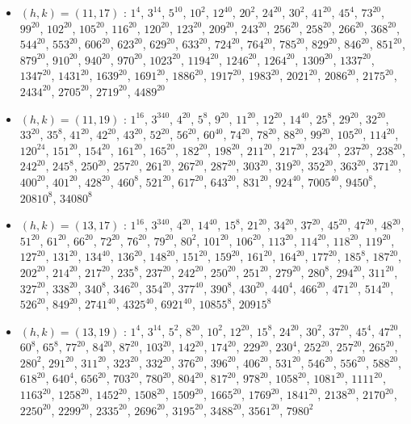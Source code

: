 \begin{itemize}
\item $(h,k)=(11,17)$ : $1^{4}$, $3^{14}$, $5^{10}$, $10^{2}$, $12^{40}$, $20^{2}$, $24^{20}$, $30^{2}$, $41^{20}$, $45^{4}$, $73^{20}$, $99^{20}$, $102^{20}$, $105^{20}$, $116^{20}$, $120^{20}$, $123^{20}$, $209^{20}$, $243^{20}$, $256^{20}$, $258^{20}$, $266^{20}$, $368^{20}$, $544^{20}$, $553^{20}$, $606^{20}$, $623^{20}$, $629^{20}$, $633^{20}$, $724^{20}$, $764^{20}$, $785^{20}$, $829^{20}$, $846^{20}$, $851^{20}$, $879^{20}$, $910^{20}$, $940^{20}$, $970^{20}$, $1023^{20}$, $1194^{20}$, $1246^{20}$, $1264^{20}$, $1309^{20}$, $1337^{20}$, $1347^{20}$, $1431^{20}$, $1639^{20}$, $1691^{20}$, $1886^{20}$, $1917^{20}$, $1983^{20}$, $2021^{20}$, $2086^{20}$, $2175^{20}$, $2434^{20}$, $2705^{20}$, $2719^{20}$, $4489^{20}$
\item $(h,k)=(11,19)$ : $1^{16}$, $3^{340}$, $4^{20}$, $5^{8}$, $9^{20}$, $11^{20}$, $12^{20}$, $14^{40}$, $25^{8}$, $29^{20}$, $32^{20}$, $33^{20}$, $35^{8}$, $41^{20}$, $42^{20}$, $43^{20}$, $52^{20}$, $56^{20}$, $60^{40}$, $74^{20}$, $78^{20}$, $88^{20}$, $99^{20}$, $105^{20}$, $114^{20}$, $120^{24}$, $151^{20}$, $154^{20}$, $161^{20}$, $165^{20}$, $182^{20}$, $198^{20}$, $211^{20}$, $217^{20}$, $234^{20}$, $237^{20}$, $238^{20}$, $242^{20}$, $245^{8}$, $250^{20}$, $257^{20}$, $261^{20}$, $267^{20}$, $287^{20}$, $303^{20}$, $319^{20}$, $352^{20}$, $363^{20}$, $371^{20}$, $400^{20}$, $401^{20}$, $428^{20}$, $460^{8}$, $521^{20}$, $617^{20}$, $643^{20}$, $831^{20}$, $924^{40}$, $7005^{40}$, $9450^{8}$, $20810^{8}$, $34080^{8}$
\item $(h,k)=(13,17)$ : $1^{16}$, $3^{340}$, $4^{20}$, $14^{40}$, $15^{8}$, $21^{20}$, $34^{20}$, $37^{20}$, $45^{20}$, $47^{20}$, $48^{20}$, $51^{20}$, $61^{20}$, $66^{20}$, $72^{20}$, $76^{20}$, $79^{20}$, $80^{2}$, $101^{20}$, $106^{20}$, $113^{20}$, $114^{20}$, $118^{20}$, $119^{20}$, $127^{20}$, $131^{20}$, $134^{40}$, $136^{20}$, $148^{20}$, $151^{20}$, $159^{20}$, $161^{20}$, $164^{20}$, $177^{20}$, $185^{8}$, $187^{20}$, $202^{20}$, $214^{20}$, $217^{20}$, $235^{8}$, $237^{20}$, $242^{20}$, $250^{20}$, $251^{20}$, $279^{20}$, $280^{8}$, $294^{20}$, $311^{20}$, $327^{20}$, $338^{20}$, $340^{8}$, $346^{20}$, $354^{20}$, $377^{40}$, $390^{8}$, $430^{20}$, $440^{4}$, $466^{20}$, $471^{20}$, $514^{20}$, $526^{20}$, $849^{20}$, $2741^{40}$, $4325^{40}$, $6921^{40}$, $10855^{8}$, $20915^{8}$
\item $(h,k)=(13,19)$ : $1^{4}$, $3^{14}$, $5^{2}$, $8^{20}$, $10^{2}$, $12^{20}$, $15^{8}$, $24^{20}$, $30^{2}$, $37^{20}$, $45^{4}$, $47^{20}$, $60^{8}$, $65^{8}$, $77^{20}$, $84^{20}$, $87^{20}$, $103^{20}$, $142^{20}$, $174^{20}$, $229^{20}$, $230^{4}$, $252^{20}$, $257^{20}$, $265^{20}$, $280^{2}$, $291^{20}$, $311^{20}$, $323^{20}$, $332^{20}$, $376^{20}$, $396^{20}$, $406^{20}$, $531^{20}$, $546^{20}$, $556^{20}$, $588^{20}$, $618^{20}$, $640^{4}$, $656^{20}$, $703^{20}$, $780^{20}$, $804^{20}$, $817^{20}$, $978^{20}$, $1058^{20}$, $1081^{20}$, $1111^{20}$, $1163^{20}$, $1258^{20}$, $1452^{20}$, $1508^{20}$, $1509^{20}$, $1665^{20}$, $1769^{20}$, $1841^{20}$, $2138^{20}$, $2170^{20}$, $2250^{20}$, $2299^{20}$, $2335^{20}$, $2696^{20}$, $3195^{20}$, $3488^{20}$, $3561^{20}$, $7980^{2}$

\end{itemize}
